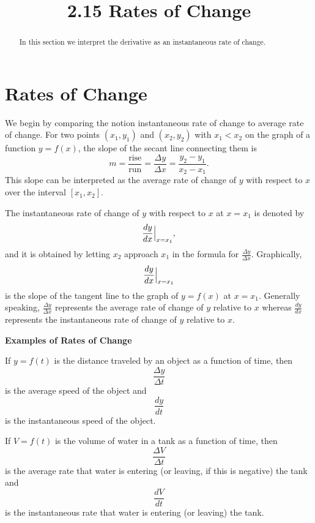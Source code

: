 \documentclass[handout]{ximera}
\title{2.15 Rates of Change}
\begin{document}
\begin{abstract}
In this section we interpret the derivative as an instantaneous rate of change.
\end{abstract}

\maketitle

\section{Rates of Change}

We begin by comparing the notion instantaneous rate of change to average rate of change. 
For two points $(x_1, y_1)$ and $(x_2, y_2)$ with $x_1 < x_2$ on the graph of a function
$y = f(x)$, the slope of the secant line connecting them is 
\[m = \frac{\text{rise}}{\text{run}} = \frac{\Delta y}{\Delta x} = \frac{y_2 - y_1}{x_2 - x_1}.\]
This slope can be interpreted as the average rate of change of $y$ with respect to $x$ over the interval $[x_1, x_2]$.

The instantaneous rate of change of $y$ with respect to $x$ at $x = x_1$ is denoted by
\[\frac{dy}{dx}\Big{|}_{x=x_1},\]
and it is obtained by letting $x_2$ approach $x_1$ in the formula for $\frac{\Delta y}{\Delta x}.$
Graphically, 
\[\frac{dy}{dx}\Big{|}_{x=x_1}\]
is the slope of the tangent line to the graph of $y = f(x)$ at $x=x_1$.
Generally speaking, $\frac{\Delta y}{\Delta x}$
represents the average rate of change of $y$ relative to $x$ whereas
$\frac{dy}{dx}$
represents the instantaneous rate of change of $y$ relative to $x$.


\begin{center}
\bf{Examples of Rates of Change}
\end{center}
 
\begin{example}[example 1]

If $y = f(t)$ is the distance traveled by an object as a function of time, then 
\[\frac{\Delta y}{\Delta t}\]
is the average speed of the object and
\[\frac{dy}{dt}\]
is the instantaneous speed of the object.
\end{example}

\begin{example} If $V = f(t)$ is the volume of water in a tank as a function of time, then 
\[\frac{\Delta V}{\Delta t}\]
is the average rate that water is entering (or leaving, if this is negative) the tank and
\[\frac{dV}{dt}\]
is the instantaneous rate that water is entering (or leaving) the tank.
 \end{example}
\end{document}
